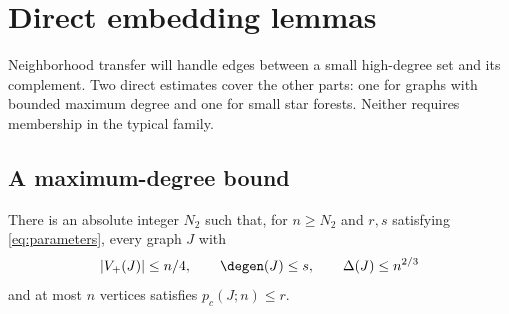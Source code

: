 \section{Direct embedding lemmas}
\label{sec:direct}

Neighborhood transfer will handle edges between a small
high-degree set and its complement. Two direct estimates cover the other parts:
one for graphs with bounded maximum degree and one for small
star forests. Neither requires membership in the typical family.

\subsection{A maximum-degree bound}

\begin{proposition}\label{prop:degree-embedding}
There is an absolute integer $N_2$ such that, for $n\geq N_2$
and $r,s$ satisfying \eqref{eq:parameters}, every graph $J$
with
\[
 |V_+(J)|\leq n/4,\qquad \degen(J)\leq s,
 \qquad\Delta(J)\leq n^{2/3}
\]
and at most $n$ vertices satisfies $p_c(J;n)\leq r$.
\end{proposition}
